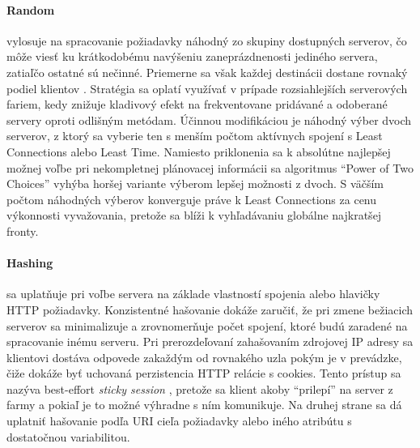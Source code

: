 \documentclass[12pt, a4paper]{article}
\begin{document}
\paragraph{Random} vylosuje na spracovanie požiadavky náhodný zo skupiny dostupných serverov, 
čo môže viesť ku krátkodobému navýšeniu zaneprázdnenosti jediného servera, zatiaľčo
ostatné sú nečinné. Priemerne sa však každej destinácii dostane rovnaký podiel klientov 
\cite{load-balance-in-distributed-system}. Stratégia sa oplatí využívať v prípade rozsiahlejších 
serverových fariem, kedy znižuje kladivový efekt na frekventovane pridávané a odoberané servery oproti
odlišným metódam. Účinnou modifikáciou je náhodný výber dvoch serverov, z ktorý sa vyberie ten
s menším počtom aktívnych spojení s Least Connections alebo Least Time. Namiesto priklonenia sa
k absolútne najlepšej možnej voľbe pri nekompletnej plánovacej informácii sa algoritmus
\enquote{Power of Two Choices} vyhýba horšej variante výberom lepšej možnosti z dvoch. S väčším počtom
náhodných výberov konverguje práve k Least Connections \cite{power-two-choices} za cenu výkonnosti 
vyvažovania, pretože sa blíži k vyhľadávaniu globálne najkratšej fronty.

\paragraph{Hashing} sa uplatňuje pri voľbe servera na základe vlastností spojenia alebo hlavičky HTTP 
požiadavky. Konzistentné hašovanie dokáže zaručiť, že pri zmene bežiacich serverov sa minimalizuje a 
zrovnomerňuje počet spojení, ktoré budú zaradené na spracovanie inému serveru. Pri prerozdeľovaní 
zahašovaním zdrojovej IP adresy sa klientovi dostáva odpovede zakaždým od rovnakého uzla pokým je v 
prevádzke, čiže dokáže byť uchovaná perzistencia HTTP relácie s cookies. Tento prístup sa nazýva
best-effort \emph{sticky session} \cite{haproxy-docs}, pretože sa klient akoby \enquote{prilepí} na server
z farmy a pokiaľ je to možné výhradne s ním komunikuje. Na druhej strane sa dá uplatniť hašovanie podľa 
URI cieľa požiadavky alebo iného atribútu s dostatočnou variabilitou.
\end{document}
